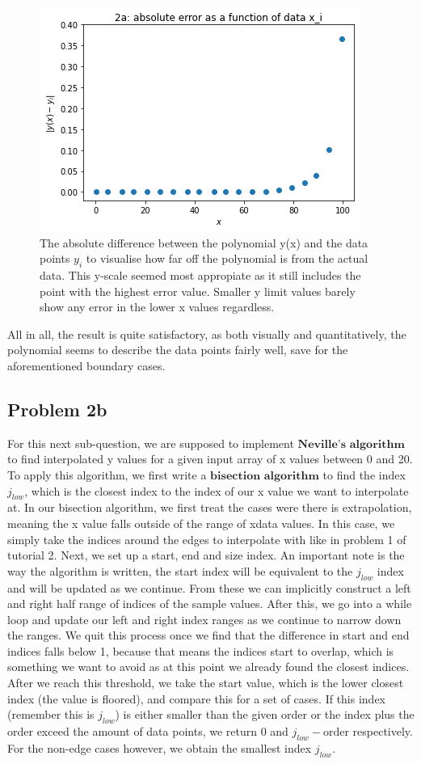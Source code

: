 \begin{figure}[h!]
  \centering
  \includegraphics[width=0.6\linewidth]{problem2a2.png}
  \caption{The absolute difference between the polynomial y(x) and the data points $y_i$ to visualise how far off the polynomial is from the actual data. This y-scale seemed most appropiate as it still includes the point with the highest error value. Smaller y limit values barely show any error in the lower x values regardless.}
  \label{fig:fig2}
\end{figure}

All in all, the result is quite satisfactory, as both visually and quantitatively, the polynomial seems to describe the data points fairly well, save for the aforementioned boundary cases. 

\subsection{Problem 2b}

For this next sub-question, we are supposed to implement $\textbf{Neville's algorithm}$ to find interpolated y values for a given input array of x values between 0 and 20. To apply this algorithm, we first write a $\textbf{bisection algorithm}$ to find the index $j_{low}$, which is the closest index to the index of our x value we want to interpolate at. In our bisection algorithm, we first treat the cases were there is extrapolation, meaning the x value falls outside of the range of xdata values. In this case, we simply take the indices around the edges to interpolate with like in problem 1 of tutorial 2. Next, we set up a start, end and size index. An important note is the way the algorithm is written, the start index will be equivalent to the $j_{low}$ index and will be updated as we continue. From these we can implicitly construct a left and right half range of indices of the sample values. After this, we go into a while loop and update our left and right index ranges as we continue to narrow down the ranges. We quit this process once we find that the difference in start and end indices falls below 1, because that means the indices start to overlap, which is something we want to avoid as at this point we already found the closest indices. After we reach this threshold, we take the start value, which is the lower closest index (the value is floored), and compare this for a set of cases. If this index (remember this is $j_{low}$) is either smaller than the given order or the index plus the order exceed the amount of data points, we return 0 and $j_{low} - \text{order}$ respectively. For the non-edge cases however, we obtain the smallest index $j_{low}$.\\


